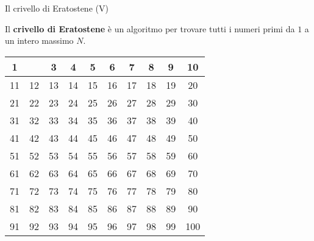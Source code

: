 \begin{frame}{Il crivello di Eratostene (V)}

  Il \textbf{crivello di Eratostene} è un algoritmo per trovare
  tutti i numeri primi da $1$ a un intero massimo $N$.

  \begin{table}[]
  \centering
    \begin{tabular}{|c|c|c|c|c|c|c|c|c|c|}
    \hline
    \cellcolor[HTML]{C0C0C0}1  & \cellcolor[HTML]{FCFF2F}{\color[HTML]{FE0000} 2} & 3  & \cellcolor[HTML]{FFCCC9}4 & 5  & 6  & 7  & 8  & 9  & 10  \\ \hline
    11 & 12                        & 13 & 14                        & 15 & 16 & 17 & 18 & 19 & 20  \\ \hline
    21 & 22                        & 23 & 24                        & 25 & 26 & 27 & 28 & 29 & 30  \\ \hline
    31 & 32                        & 33 & 34                        & 35 & 36 & 37 & 38 & 39 & 40  \\ \hline
    41 & 42                        & 43 & 44                        & 45 & 46 & 47 & 48 & 49 & 50  \\ \hline
    51 & 52                        & 53 & 54                        & 55 & 56 & 57 & 58 & 59 & 60  \\ \hline
    61 & 62                        & 63 & 64                        & 65 & 66 & 67 & 68 & 69 & 70  \\ \hline
    71 & 72                        & 73 & 74                        & 75 & 76 & 77 & 78 & 79 & 80  \\ \hline
    81 & 82                        & 83 & 84                        & 85 & 86 & 87 & 88 & 89 & 90  \\ \hline
    91 & 92                        & 93 & 94                        & 95 & 96 & 97 & 98 & 99 & 100 \\ \hline
    \end{tabular}
  \end{table}

\end{frame}


